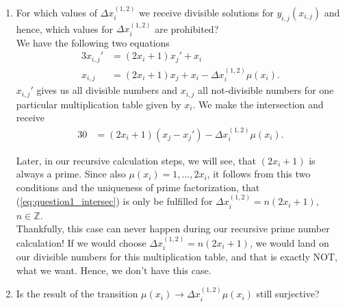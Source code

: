 \begin{enumerate}
	\item For which values of $\Delta x_{i}^{\left(1,2\right)}$ we receive divisible solutions for $y_{i,j}\left(x_{i,j}\right)$ and hence, which values for $\Delta x_{i}^{\left(1,2\right)}$ are prohibited?\\

	We have the following two equations
	\begin{alignat}{3}
		x_{i,j}\prime &= \left(2x_{i} + 1\right)x_{j}\prime + x_{i} \label{eq:question1_div} \\
		x_{i,j} &= \left(2x_{i} + 1\right)x_{j} + x_{i} - \Delta x_{i}^{\left(1,2\right)}\mu\left(x_{i}\right) \label{eq:question1_notdiv}.
	\end{alignat}
	$x_{i,j}\prime$ gives us all divisible numbers and $x_{i,j}$ all not-divisible numbers for one particular multiplication table given by $x_{i}$. We make the intersection and receive
	\begin{alignat}{3}
		0 &= \left(2x_{i} + 1\right)\left(x_{j} - x_{j}\prime\right) - \Delta x_{i}^{\left(1,2\right)}\mu\left(x_{i}\right). \label{eq:question1_intersec}
	\end{alignat}

	Later, in our recursive calculation steps, we will see, that $\left(2x_{i} + 1\right)$ is always a prime. Since also $\mu\left(x_{i}\right) = 1, \dots, 2x_{i}$, it follows from this two conditions and the uniqueness of prime factorization, that (\ref{eq:question1_intersec}) is only be fulfilled for $\Delta x_{i}^{\left(1,2\right)} = n\left(2x_{i} + 1\right)$, $n \in \mathbb{Z}$.\\

	Thankfully, this case can never happen during our recursive prime number calculation! If we would choose $\Delta x_{i}^{\left(1,2\right)} = n\left(2x_{i} + 1\right)$, we would land on our divisible numbers for this multiplication table, and that is exactly NOT, what we want. Hence, we don't have this case.

	\item Is the result of the transition $\mu\left(x_{i}\right) \rightarrow \Delta x_{i}^{\left(1,2\right)}\mu\left(x_{i}\right)$ still surjective?\\


\end{enumerate}
